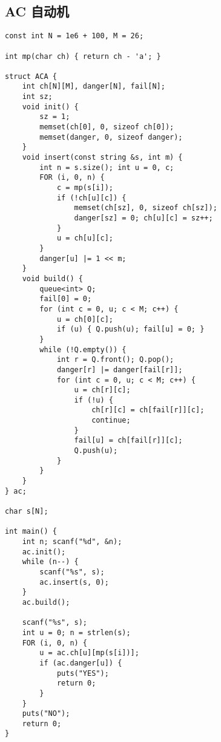 \documentclass[]{article}
\begin{document}
\hypertarget{ac-ux81eaux52a8ux673a}{%
\subsection{AC 自动机}\label{ac-ux81eaux52a8ux673a}}

\begin{verbatim}
const int N = 1e6 + 100, M = 26;

int mp(char ch) { return ch - 'a'; }

struct ACA {
    int ch[N][M], danger[N], fail[N];
    int sz;
    void init() {
        sz = 1;
        memset(ch[0], 0, sizeof ch[0]);
        memset(danger, 0, sizeof danger);
    }
    void insert(const string &s, int m) {
        int n = s.size(); int u = 0, c;
        FOR (i, 0, n) {
            c = mp(s[i]);
            if (!ch[u][c]) {
                memset(ch[sz], 0, sizeof ch[sz]);
                danger[sz] = 0; ch[u][c] = sz++;
            }
            u = ch[u][c];
        }
        danger[u] |= 1 << m;
    }
    void build() {
        queue<int> Q;
        fail[0] = 0;
        for (int c = 0, u; c < M; c++) {
            u = ch[0][c];
            if (u) { Q.push(u); fail[u] = 0; }
        }
        while (!Q.empty()) {
            int r = Q.front(); Q.pop();
            danger[r] |= danger[fail[r]];
            for (int c = 0, u; c < M; c++) {
                u = ch[r][c];
                if (!u) {
                    ch[r][c] = ch[fail[r]][c];
                    continue;
                }
                fail[u] = ch[fail[r]][c];
                Q.push(u);
            }
        }
    }
} ac;

char s[N];

int main() {
    int n; scanf("%d", &n);
    ac.init();
    while (n--) {
        scanf("%s", s);
        ac.insert(s, 0);
    }
    ac.build();

    scanf("%s", s);
    int u = 0; n = strlen(s);
    FOR (i, 0, n) {
        u = ac.ch[u][mp(s[i])];
        if (ac.danger[u]) {
            puts("YES");
            return 0;
        }
    }
    puts("NO");
    return 0;
}
\end{verbatim}
\end{document}
